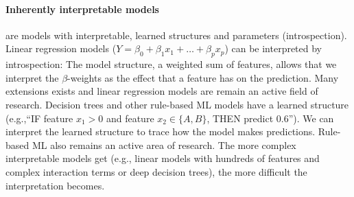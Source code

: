 \documentclass[runningheads]{llncs}
\begin{document}
\paragraph{Inherently interpretable models} are models with interpretable, learned structures and parameters (introspection).
Linear regression models ($Y = \beta_0 + \beta_1 x_1 + \ldots + \beta_p x_p$) can be interpreted by introspection:
The model structure, a weighted sum of features, allows that we interpret the $\beta$-weights as the effect that a feature has on the prediction.
Many extensions exists and linear regression models are remain an active field of research.
Decision trees and other rule-based ML models have a learned structure (e.g.,\enquote{IF feature $x_1 > 0$ and feature $x_2 \in \{A,B\}$, THEN predict 0.6}).
We can interpret the learned structure to trace how the model makes predictions.
Rule-based ML also remains an active area of research.
The more complex interpretable models get (e.g., linear models with hundreds of features and complex interaction terms or deep decision trees), the more difficult the interpretation becomes.
\end{document}
